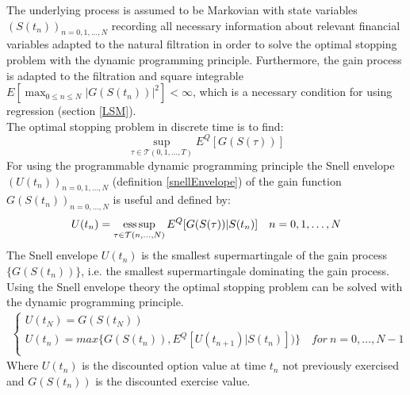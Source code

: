 The underlying process is assumed to be Markovian with state variables $(S(t_n))_{n=0,1,\ldots,N}$ recording all necessary information about relevant financial variables adapted to the natural filtration in order to solve the optimal stopping problem with the dynamic programming principle. Furthermore, the gain process is adapted to the filtration and square integrable $E[\max_{0\leq n \leq N} |G(S(t_n))|^2]<\infty$, which is a necessary condition for using regression (section \ref{LSM}).\\

The optimal stopping problem in discrete time is to find:
\begin{equation}\label{Bermudanstop1}
\sup_{\tau \in \mathcal{T}(0,1,\ldots,T)} E^Q[G(S(\tau))]
\end{equation}
For using the programmable dynamic programming principle the Snell envelope $(U(t_{n}))_{n=0,1,\ldots, N}$ (definition \ref{snellEnvelope}) of the gain function $G(S(t_n))_{n=0,\ldots,N}$ is useful and defined by:
$$U(t_n)=\operatorname*{ess\,sup}_{\tau \in \mathcal{T}(n,\ldots, N)} E^Q[G(S(\tau))|S(t_n)] \quad n=0,1, \ldots, N$$
The Snell envelope $U(t_n)$ is the smallest supermartingale of the gain process $\{G(S(t_n))\}$, i.e. the smallest supermartingale dominating the gain process. Using the Snell envelope theory the optimal stopping problem can be solved with the dynamic programming principle.
\begin{equation}\label{valueIteration}
\begin{split}
\begin{cases}
          U(t_{N}) = G(S(t_N))\\
          U(t_n) = max\{ G(S(t_n)), E^Q[U(t_{n+1})|S(t_n)])\} \quad for \ n={0,\ldots,N-1} \\ 
\end{cases}
\end{split}
\end{equation}
Where $U(t_n)$ is the discounted option value at time $t_n$ not previously exercised and $G(S(t_n))$ is the discounted exercise value.\\

